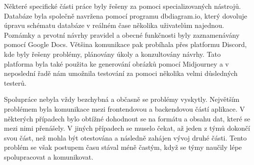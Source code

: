 Některé specifické části práce byly řešeny za pomoci specializovaných nástrojů. Databáze byla společně navržena pomocí programu dbdiagram.io, který dovoluje úpravu schématu databáze v reálném čase několika uživatelům najednou. Poznámky a prvotní návrhy pravidel a obecné funkčnosti byly zaznamenávány pomocí Google Docs. Většina komunikace pak probíhala přes platformu Discord, kde byly řešeny problémy, plánovány úkoly a konzultovány návrhy. Tato platforma byla také použita ke generování obrázků pomocí Midjourney a v neposlední řadě nám umožnila testování za pomoci několika velmi důsledných testerů.

Spolupráce nebyla vždy bezchybná a občasně se problémy vyskytly. Největším problémem byla komunikace mezi frontendovou a backendovou částí aplikace. V některých případech bylo obtížné dohodnout se na formátu a obsahu dat, které se mezi nimi přenášely. V jiných případech se muselo čekat, až jeden z týmů dokončí svou část, než mohla být otestována a následně zahájen vývoj druhé části. Tento problém se však postupem času stával méně častým, když se týmy naučily lépe spolupracovat a komunikovat.